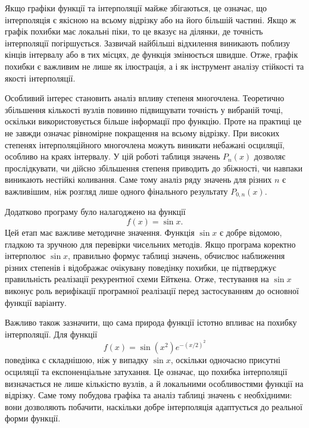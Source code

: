 \documentclass[12pt,a4paper]{article}
\begin{document}
    Якщо графіки функції та інтерполяції майже збігаються, це означає, що інтерполяція є якісною на всьому відрізку або на його більшій частині. Якщо ж графік похибки має локальні піки, то це вказує на ділянки, де точність інтерполяції погіршується. Зазвичай найбільші відхилення виникають поблизу кінців інтервалу або в тих місцях, де функція змінюється швидше. Отже, графік похибки є важливим не лише як ілюстрація, а і як інструмент аналізу стійкості та якості інтерполяції.

    Особливий інтерес становить аналіз впливу степеня многочлена. Теоретично збільшення кількості вузлів повинно підвищувати точність у вибраній точці, оскільки використовується більше інформації про функцію. Проте на практиці це не завжди означає рівномірне покращення на всьому відрізку. При високих степенях інтерполяційного многочлена можуть виникати небажані осциляції, особливо на краях інтервалу. У цій роботі таблиця значень $P_n(x)$ дозволяє прослідкувати, чи дійсно збільшення степеня приводить до збіжності, чи навпаки виникають нестійкі коливання. Саме тому аналіз ряду значень для різних $n$ є важливішим, ніж розгляд лише одного фінального результату $P_{0,n}(x)$.

    Додатково програму було налагоджено на функції
    $$
    f(x)=\sin x.
    $$
    Цей етап має важливе методичне значення. Функція $\sin x$ є добре відомою, гладкою та зручною для перевірки чисельних методів. Якщо програма коректно інтерполює $\sin x$, правильно формує таблиці значень, обчислює наближення різних степенів і відображає очікувану поведінку похибки, це підтверджує правильність реалізації рекурентної схеми Ейткена. Отже, тестування на $\sin x$ виконує роль верифікації програмної реалізації перед застосуванням до основної функції варіанту.

    Важливо також зазначити, що сама природа функції істотно впливає на похибку інтерполяції. Для функції
    $$
    f(x)=\sin(x^2)e^{-(x/2)^2}
    $$
    поведінка є складнішою, ніж у випадку $\sin x$, оскільки одночасно присутні осциляції та експоненціальне затухання. Це означає, що похибка інтерполяції визначається не лише кількістю вузлів, а й локальними особливостями функції на відрізку. Саме тому побудова графіка та аналіз таблиці значень є необхідними: вони дозволяють побачити, наскільки добре інтерполяція адаптується до реальної форми функції.
\end{document}
